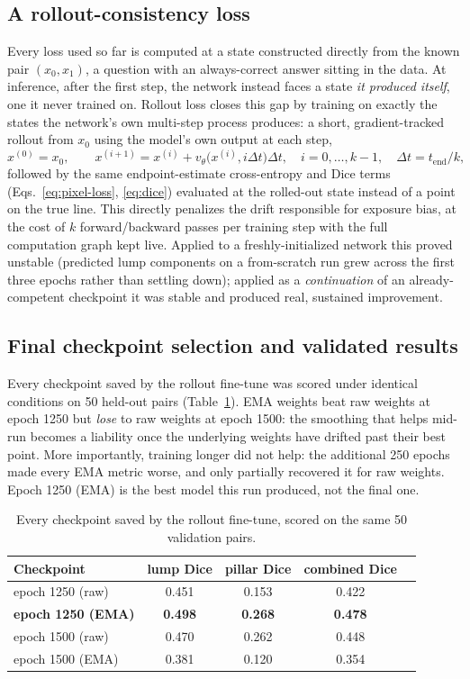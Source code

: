 \documentclass[11pt]{article}
\begin{document}
\subsection{A rollout-consistency loss}
Every loss used so far is computed at a state constructed directly from the known pair
$(x_0,x_1)$, a question with an always-correct answer sitting in the data. At inference,
after the first step, the network instead faces a state \emph{it produced itself}, one it never
trained on. Rollout loss closes this gap by training on exactly the states the network's own
multi-step process produces: a short, gradient-tracked rollout from $x_0$ using the model's own
output at each step,
\begin{equation}
x^{(0)}=x_0, \qquad x^{(i+1)} = x^{(i)} + v_\theta\big(x^{(i)}, i\Delta t\big)\Delta t, \quad
i=0,\dots,k-1,\quad \Delta t = t_{\text{end}}/k, \label{eq:rollout}
\end{equation}
followed by the same endpoint-estimate cross-entropy and Dice terms (Eqs.~\ref{eq:pixel-loss},
\ref{eq:dice}) evaluated at the rolled-out state instead of a point on the true line. This
directly penalizes the drift responsible for exposure bias, at the cost of $k$ forward/backward
passes per training step with the full computation graph kept live. Applied to a
freshly-initialized network this proved unstable (predicted lump components on a from-scratch
run grew across the first three epochs rather than settling down); applied as a
\emph{continuation} of an already-competent checkpoint it was stable and produced real,
sustained improvement.

\subsection{Final checkpoint selection and validated results}
Every checkpoint saved by the rollout fine-tune was scored under identical conditions on 50
held-out pairs (Table~\ref{tab:checkpoints}). EMA weights beat raw weights at epoch 1250 but
\emph{lose} to raw weights at epoch 1500: the smoothing that helps mid-run becomes a liability
once the underlying weights have drifted past their best point. More importantly, training
longer did not help: the additional 250 epochs made every EMA metric worse, and only
partially recovered it for raw weights. Epoch 1250 (EMA) is the best model this run produced,
not the final one.

\begin{table}[H]
\centering
\begin{tabular}{@{}lcccc@{}}
\toprule
Checkpoint & lump Dice & pillar Dice & combined Dice \\
\midrule
epoch 1250 (raw) & 0.451 & 0.153 & 0.422 \\
\textbf{epoch 1250 (EMA)} & \textbf{0.498} & \textbf{0.268} & \textbf{0.478} \\
epoch 1500 (raw) & 0.470 & 0.262 & 0.448 \\
epoch 1500 (EMA) & 0.381 & 0.120 & 0.354 \\
\bottomrule
\end{tabular}
\caption{Every checkpoint saved by the rollout fine-tune, scored on the same 50 validation
pairs.}
\label{tab:checkpoints}
\end{table}
\end{document}
